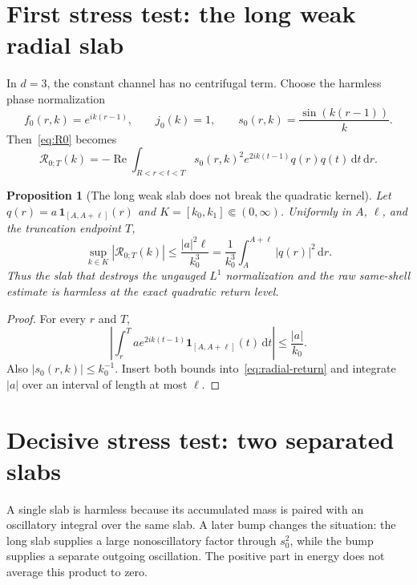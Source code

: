 \documentclass[11pt]{article}
\newcommand{\dd}{\,\mathrm d}
\newcommand{\cR}{\mathcal R}
\DeclareMathOperator{\Rea}{Re}
\newtheorem{proposition}{Proposition}[section]
\theoremstyle{definition}
\begin{document}
\section{First stress test: the long weak radial slab}

In $d=3$, the constant channel has no centrifugal term.  Choose the harmless phase normalization
\begin{equation}
 f_0(r,k)=e^{ik(r-1)},
 \qquad j_0(k)=1,
 \qquad s_0(r,k)=\frac{\sin(k(r-1))}{k}.
\end{equation}
Then~\eqref{eq:R0} becomes
\begin{equation}
 \cR_{0;T}(k)
 =-\Rea\int_{R<r<t<T}
 s_0(r,k)^2e^{2ik(t-1)}q(r)q(t)\dd t\dd r.
 \label{eq:radial-return}
\end{equation}

\begin{proposition}[The long weak slab does not break the quadratic kernel]
\label{prop:slab-test}
Let $q(r)=a\,\mathbf1_{[A,A+\ell]}(r)$ and $K=[k_0,k_1]\Subset(0,\infty)$.  Uniformly in $A$, $\ell$, and the truncation endpoint $T$,
\begin{equation}
 \sup_{k\in K}|\cR_{0;T}(k)|
 \leq \frac{|a|^2\ell}{k_0^3}
 =\frac1{k_0^3}\int_A^{A+\ell}|q(r)|^2\dd r.
 \label{eq:slab-bound}
\end{equation}
Thus the slab that destroys the ungauged $L^1$ normalization and the raw same-shell estimate is harmless at the exact quadratic return level.
\end{proposition}

\begin{proof}
For every $r$ and $T$,
\begin{equation}
 \left|\int_r^T a e^{2ik(t-1)}\mathbf1_{[A,A+\ell]}(t)\dd t\right|
 \leq\frac{|a|}{k_0}.
\end{equation}
Also $|s_0(r,k)|\leq k_0^{-1}$.  Insert both bounds into~\eqref{eq:radial-return} and integrate $|a|$ over an interval of length at most $\ell$.
\end{proof}

\section{Decisive stress test: two separated slabs}

A single slab is harmless because its accumulated mass is paired with an oscillatory integral over the same slab.  A later bump changes the situation: the long slab supplies a large nonoscillatory factor through $s_0^2$, while the bump supplies a separate outgoing oscillation.  The positive part in energy does not average this product to zero.
\end{document}
